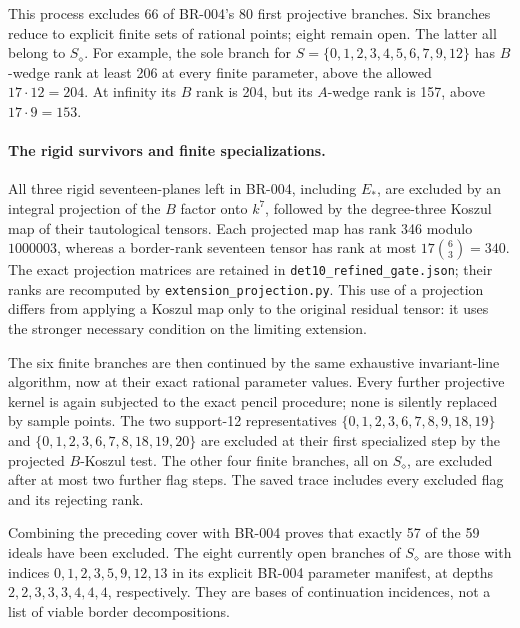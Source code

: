 This process excludes 66 of BR-004's 80 first projective branches.
Six branches reduce to explicit finite sets of rational points; eight
remain open.  The latter all belong to $S_\diamond$.
For example, the sole branch for
$S=\{0,1,2,3,4,5,6,7,9,12\}$ has $B$-wedge rank at least 206
at every finite parameter, above the allowed $17\cdot12=204$.
At infinity its $B$ rank is 204, but its $A$-wedge rank is
157, above $17\cdot9=153$.

\paragraph{The rigid survivors and finite specializations.}
All three rigid seventeen-planes left in BR-004, including $E_*$,
are excluded by an integral projection of the $B$ factor onto $k^7$,
followed by the degree-three Koszul map of their tautological tensors.
Each projected map has rank 346 modulo $1000003$, whereas a border-rank
seventeen tensor has rank at most
$17\binom{6}{3}=340$.  The exact projection matrices are retained in
\texttt{det10\_refined\_gate.json}; their ranks are recomputed by
\texttt{extension\_projection.py}.  This use of a projection differs
from applying a Koszul map only to the original residual tensor: it
uses the stronger necessary condition on the limiting extension.

The six finite branches are then continued by the same exhaustive
invariant-line algorithm, now at their exact rational parameter values.
Every further projective kernel is again subjected to the exact pencil
procedure; none is silently replaced by sample points.  The two support-12
representatives
$\{0,1,2,3,6,7,8,9,18,19\}$ and
$\{0,1,2,3,6,7,8,18,19,20\}$ are excluded at their first specialized
step by the projected $B$-Koszul test.  The other four finite branches,
all on $S_\diamond$, are excluded after at most two further flag steps.
The saved trace includes every excluded flag and its rejecting rank.

Combining the preceding cover with BR-004 proves that exactly 57 of
the 59 ideals have been excluded.  The eight currently open branches
of $S_\diamond$ are those with indices
$0,1,2,3,5,9,12,13$ in its explicit BR-004 parameter manifest,
at depths $2,2,3,3,3,4,4,4$, respectively.  They are bases of
continuation incidences, not a list of viable border decompositions.


